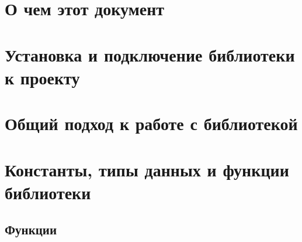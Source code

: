 \documentclass[12pt,a4paper,titlepage]{report}
\begin{document}
  \tableofcontents
  

\chapter{О чем этот документ}

\chapter{Установка и подключение библиотеки к проекту}

\chapter{Общий подход к работе с библиотекой}


  
\chapter{Константы, типы данных и функции библиотеки}



%
%
%
\section{Функции}











\end{document}

